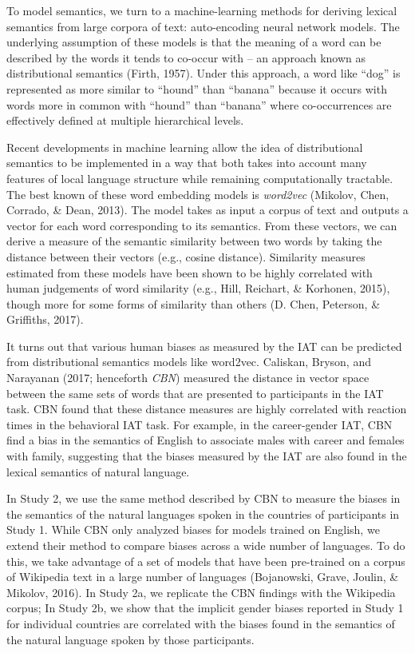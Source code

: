 \documentclass[10pt, letterpaper]{article}
\begin{document}
To model semantics, we turn to a machine-learning methods for deriving
lexical semantics from large corpora of text: auto-encoding neural
network models. The underlying assumption of these models is that the
meaning of a word can be described by the words it tends to co-occur
with -- an approach known as distributional semantics (Firth, 1957).
Under this approach, a word like ``dog'' is represented as more similar
to ``hound'' than ``banana'' because it occurs with words more in common
with ``hound'' than ``banana'' where co-occurrences are effectively
defined at multiple hierarchical levels.

Recent developments in machine learning allow the idea of distributional
semantics to be implemented in a way that both takes into account many
features of local language structure while remaining computationally
tractable. The best known of these word embedding models is
\emph{word2vec} (Mikolov, Chen, Corrado, \& Dean, 2013). The model takes
as input a corpus of text and outputs a vector for each word
corresponding to its semantics. From these vectors, we can derive a
measure of the semantic similarity between two words by taking the
distance between their vectors (e.g., cosine distance). Similarity
measures estimated from these models have been shown to be highly
correlated with human judgements of word similarity (e.g., Hill,
Reichart, \& Korhonen, 2015), though more for some forms of similarity
than others (D. Chen, Peterson, \& Griffiths, 2017).

It turns out that various human biases as measured by the IAT can be
predicted from distributional semantics models like word2vec. Caliskan,
Bryson, and Narayanan (2017; henceforth \emph{CBN}) measured the
distance in vector space between the same sets of words that are
presented to participants in the IAT task. CBN found that these distance
measures are highly correlated with reaction times in the behavioral IAT
task. For example, in the career-gender IAT, CBN find a bias in the
semantics of English to associate males with career and females with
family, suggesting that the biases measured by the IAT are also found in
the lexical semantics of natural language.

In Study 2, we use the same method described by CBN to measure the
biases in the semantics of the natural languages spoken in the countries
of participants in Study 1. While CBN only analyzed biases for models
trained on English, we extend their method to compare biases across a
wide number of languages. To do this, we take advantage of a set of
models that have been pre-trained on a corpus of Wikipedia text in a
large number of languages (Bojanowski, Grave, Joulin, \& Mikolov, 2016).
In Study 2a, we replicate the CBN findings with the Wikipedia corpus; In
Study 2b, we show that the implicit gender biases reported in Study 1
for individual countries are correlated with the biases found in the
semantics of the natural language spoken by those participants.
\end{document}
